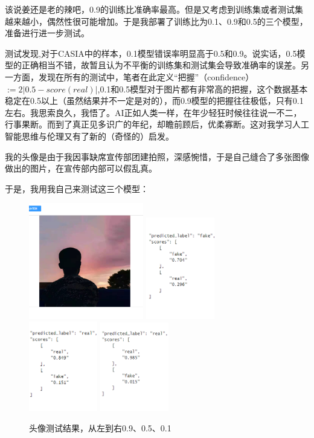 \documentclass[boldfont,linespread=1.35]{ctexart}
\begin{document}
该说姜还是老的辣吧，0.9的训练比准确率最高。但是又考虑到训练集或者测试集越来越小，偶然性很可能增加。于是我部署了训练比为0.1、0.9和0.5的三个模型，准备进行进一步测试。

测试发现,对于CASIA中的样本，0.1模型错误率明显高于0.5和0.9。说实话，0.5模型的正确相当不错，故暂且认为不平衡的训练集和测试集会导致准确率的误差。另一方面，发现在所有的测试中，笔者在此定义“把握”（confidence）$:=2\left|0.5-score(real)\right|$,0.1和0.5模型对于图片都有非常高的把握，这个数据基本稳定在0.5以上（虽然结果并不一定是对的），而0.9模型的把握往往极低，只有0.1左右。我思索良久，我悟了。AI正如人类一样，在年少轻狂时候往往说一不二，行事果断。而到了真正见多识广的年纪，却瞻前顾后，优柔寡断。这对我学习人工智能思维与伦理又有了新的（奇怪的）启发。

我的头像是由于我因事缺席宣传部团建拍照，深感惋惜，于是自己缝合了多张图像做出的图片，在宣传部内部可以假乱真。

于是，我用我自己来测试这三个模型：
\begin{figure}[h]
	\centering
	{\includegraphics[width=5cm]{11}}
	{\includegraphics[width=3cm]{22}}
	{\includegraphics[width=3cm]{33}}
	{\includegraphics[width=3cm]{44}}
	\color{gray}\caption{头像测试结果，从左到右0.9、0.5、0.1}
\end{figure}
\end{document}
